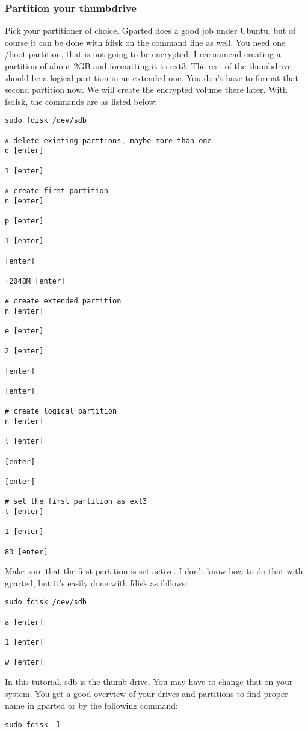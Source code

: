 \documentclass[12pt,a4paper]{article}
\begin{document}
\subsubsection{Partition your thumbdrive}
Pick your partitioner of choice. Gparted does a good job under Ubuntu, but of course it can be done with fdisk on the command line as well. You need one /boot partition, that is not going to be encrypted. I recommend creating a partition of about 2GB and formatting it to ext3. The rest of the thumbdrive should be a logical partition in an extended one. You don't have to format that second partition now. We will create the encrypted volume there later. With fsdisk, the commands are as listed below:
\begin{Verbatim}[commandchars=\\\{\}]
sudo fdisk /dev/sdb

# delete existing parttions, maybe more than one
d [enter]

1 [enter]

# create first partition
n [enter]

p [enter]

1 [enter]

[enter]

+2048M [enter]

# create extended partition
n [enter]

e [enter]

2 [enter]

[enter]

[enter]

# create logical partition
n [enter]

l [enter]

[enter]

[enter]

# set the first partition as ext3
t [enter]

1 [enter]

83 [enter] 
\end{Verbatim}

Make sure that the first partition is set active. I don't know how to do that with gparted, but it's easily done with fdisk as follows:
\begin{Verbatim}[commandchars=\\\{\}]
sudo fdisk /dev/sdb

a [enter]

1 [enter]

w [enter]

\end{Verbatim}
In this tutorial, sdb is the thumb drive. You may have to change that on your system. You get a good overview of your drives and partitions to find proper name in gparted or by the following command:
\begin{Verbatim}[commandchars=\\\{\}]
sudo fdisk -l
\end{Verbatim}
\end{document}
